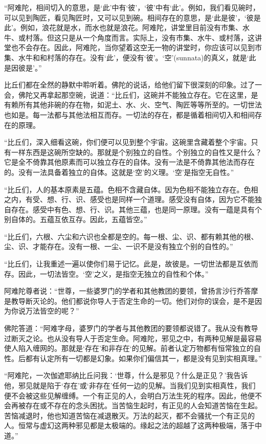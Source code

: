 \documentclass[12pt,twoside,openany]{book}
\begin{document}
“阿难陀，相间切入的意思，是‘此’中有‘彼’，‘彼’中有‘此’。例如，我们看见碗时，可以见到陶匠，看见陶匠时，又可以见到碗。相间存在的意思，是‘此是彼’，‘彼是此’。例如，浪花就是水，而水也就是浪花。阿难陀，讲堂里目前没有市集、水牛、或村落。但这只是从一个角度而言。实际上，没有市集、水牛、或村落，这讲堂也不会存在。因此，阿难陀，当你望着这空无一物的讲堂时，你应该可以见到市集、水牛和和村落的存在。没有‘此’，便没有‘彼’。‘空’(sunnata)的真义，就是‘此是因彼是’。”

比丘们都在全然的静默中聆听着。佛陀的说话，给他们留下很深刻的印象。过了一会，佛陀又再拿起那空碗，说道：“比丘们，这碗并不能独立存在。它在这里，是有赖所有其他非碗的存在物，如泥土、水、火、空气、陶匠等等所至的。一切世法也如是。每一法都与其他法相互而存。一切法的存在，都是循着相间切入和相间存在的原理。

“比丘们，深入细看这碗，你们便可以见到整个宇宙。这碗里含藏着整个宇宙。只有一样东西是这碗所空缺的。那就是个别独立的自性。个别独立的自性又是什么？它是全不倚靠其他原素而可以独立存在的自体。没有一法是不倚靠其他法而存在的。没有一法具备着独立的自体。这就是‘空’的义理。‘空’是指空无自性。”

“比丘们，人的基本原素是五蕴。色相不含藏自体。因为色相不能独立存在。色相之内，有受、想、行、识、感受也是同样一个道理。感受没有自体，因为它不能独自存在。感受中有色、想、行、识。其他三蕴，也是同一原理。没有一蕴是具有个别自体的。五蕴互依互存。因此，五蕴皆空。”

“比丘们，六根、六尘和六识也全都是空的。每一根、尘、识、都有赖其他的根、尘、识、才能存在。没有一根、一尘、一识不是没有独立个别的自性的。”

“比丘们，让我重述一遍以使你们易于记忆。此是，故彼是。一切世法都是互依而存。因此，一切法皆空。‘空’之义，是指空无独立的自性和个体。”

阿难陀尊者说：“世尊，一些婆罗门的学者和其他教团的要领，曾扬言沙行乔答摩是教导断灭论的。他们都说你导人于否定生命的一切。他们对你的误会，是不是因为你说万法皆空的呢？”

佛陀答道：“阿难字母，婆罗门的学者与其他教团的要领都说错了。我从没有教导过断灭之论。也从没有导人于否定生命。阿难陀，邪见之中，有两种见解是最容易使人陷入缠网的。那就是‘存在’和非存在‘的见解。前者认定万物都有恒常独立的自性。后都有认定所有一切都是幻象。如果你们偏信其一，都是没有见到实相真理。”

“阿难陀，一次伽遮耶纳比丘问我：‘世尊，什么是邪见？什么是正见？’我告诉他，邪见就是陷于‘存在’或‘非存在’任何一边的见解。当我们见到实相真性，我们便不会被这些见解缠缚。一个有正见的人，会明白万法生死的程序。因此，他便不会再被存在或不存在的念头困扰。当苦恼生起时，有正见的人会知道苦恼在生起。苦恼减退时，他也知道苦恼在减退散灭。万法的起灭，都不会骚扰一个有正见的人。恒常与虚幻这两种邪见都是太极端的。缘起之法的超越了这两种极端，落于中道。”
\end{document}
